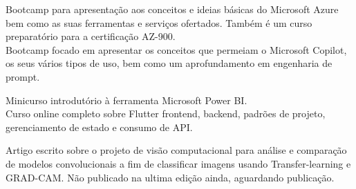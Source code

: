 \documentclass[
    10pt,
    english,
]{article}
\begin{document}
{}
{Bootcamp para apresentação aos conceitos e ideias básicas do Microsoft Azure bem como as suas ferramentas e serviços ofertados. Também é um curso preparatório para a certificação AZ-900.}
\\
\noindent {}
{Bootcamp focado em apresentar os conceitos que permeiam o Microsoft Copilot, os seus vários tipos de uso, bem como um aprofundamento em engenharia de prompt.}

\newpage

\noindent {}
{Minicurso introdutório à ferramenta Microsoft Power BI.}
\\
\noindent {}
{Curso online completo sobre Flutter frontend, backend, padrões de projeto, gerenciamento de estado e consumo de API.}

{Artigo escrito sobre o projeto de visão computacional para análise e comparação de modelos convolucionais a fim de classificar imagens usando Transfer-learning e GRAD-CAM. Não publicado na ultima edição ainda, aguardando publicação.}
\end{document}
